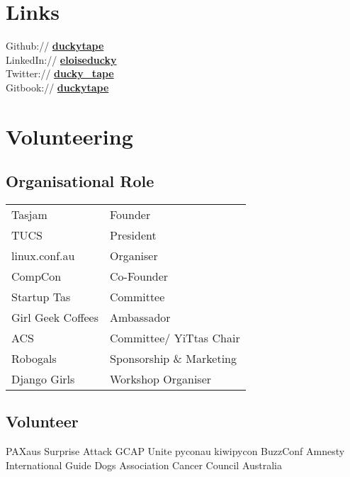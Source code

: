 \documentclass[a4paper]{deedy-resume} %
\begin{document}
\begin{minipage}[t]{0.33\textwidth} %

\section{Links}

Github:// \href{https://github.com/duckytape}{\bf duckytape} \\
LinkedIn:// \href{https://www.linkedin.com/in/eloiseducky}{\bf eloiseducky} \\
Twitter:// \href{https://twitter.com/ducky_tape}{\bf ducky\_tape}\\
Gitbook:// \href{https:duckytape.gitbooks.io//}{\bf duckytape} \\

\sectionspace %


\section{Volunteering}

\subsection{Organisational Role}
\begin{tabular}{l p{}}
Tasjam & Founder \\
TUCS & President \\
linux.conf.au & Organiser \\
CompCon & Co-Founder \\
Startup Tas & Committee \\
Girl Geek Coffees & Ambassador \\
ACS & Committee/ YiTtas Chair \\
Robogals & Sponsorship \& Marketing \\
Django Girls & Workshop Organiser \\
\end{tabular}

\sectionspace
\subsection{Volunteer} %
PAXaus \textbullet{} Surprise Attack \textbullet{} GCAP \textbullet{} Unite \textbullet{}
pyconau \textbullet{} kiwipycon \textbullet{} BuzzConf \textbullet{} Amnesty International
\textbullet{} Guide Dogs Association \textbullet{} Cancer Council Australia \\

\sectionspace %

\end{minipage} %
\end{document}
